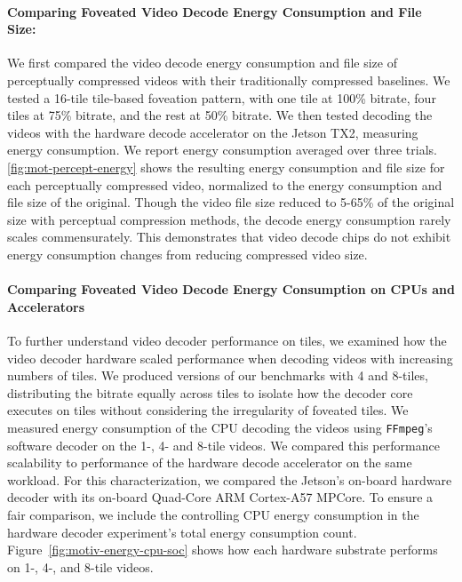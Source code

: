 \paragraph{Comparing Foveated Video Decode Energy Consumption and File Size:} We first compared the video decode energy consumption and file size of perceptually compressed videos with their traditionally compressed baselines.
We tested a 16-tile tile-based foveation pattern, with one tile at 100\% bitrate, four tiles at 75\% bitrate, and the rest at 50\% bitrate.
We then tested decoding the videos with the hardware decode accelerator on the Jetson TX2, measuring energy consumption.
We report energy consumption averaged over three trials.
\ref{fig:mot-percept-energy} shows the resulting energy consumption and file size for each perceptually compressed video, normalized to the energy consumption and file size of the original.
Though the video file size reduced to 5-65\% of the original size with perceptual compression methods, the decode energy consumption rarely scales commensurately.
This demonstrates that video decode chips do not exhibit energy consumption changes from reducing compressed video size.

\motPerceptualEnergy

\paragraph{Comparing Foveated Video Decode Energy Consumption on CPUs and Accelerators}

To further understand video decoder performance on tiles, we examined how the video decoder hardware scaled performance when decoding videos with increasing numbers of tiles.
We produced versions of our benchmarks with 4 and 8-tiles, distributing the bitrate equally across tiles to isolate how the decoder core executes on tiles without considering the irregularity of foveated tiles.
We measured energy consumption of the CPU decoding the videos using \texttt{FFmpeg}'s software \hevc decoder on the 1-, 4- and 8-tile videos.
We compared this performance scalability to performance of the hardware decode accelerator on the same workload.
For this characterization, we compared the Jetson's on-board hardware decoder with its on-board Quad-Core ARM Cortex-A57 MPCore.
To ensure a fair comparison, we include the controlling CPU energy consumption in the hardware decoder experiment's total energy consumption count.
Figure~\ref{fig:motiv-energy-cpu-soc} shows how each hardware substrate performs on 1-, 4-, and 8-tile videos.

